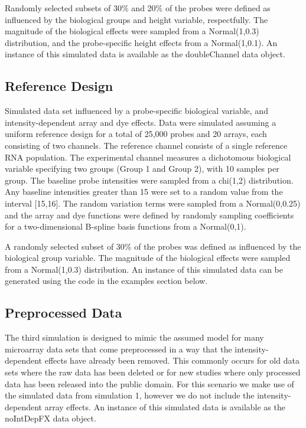 \documentclass[11pt]{article}
\begin{document}
Randomly selected subsets of 30\% and 20\% of the probes were defined as influenced by the biological groups and 
height variable, respectfully.  The magnitude of the biological effects were sampled from a Normal(1,0.3) distribution, 
and the probe-specific height effects from a Normal(1,0.1). An instance of this simulated data is available as the doubleChannel data object. 

\subsection{Reference Design}\label{simDetailsRD}
Simulated data set influenced by a probe-specific biological variable, and intensity-dependent
array and dye effects.  Data were simulated assuming a uniform reference design for a total of 25,000 probes and 20 arrays, each consisting of two channels.  
The reference channel consists of a single reference RNA population. The experimental channel measures a 
dichotomous biological variable specifying two groups (Group 1 and Group 2), with 10 samples per group.  The baseline probe intensities  
were sampled from a chi(1,2) distribution.  Any baseline intensities greater than 15 were set to a random value from the 
interval [15,16].  The random variation terms were sampled from a Normal(0,0.25) and the array and dye functions were defined by randomly sampling coefficients 
for a two-dimensional B-spline basis functions from a Normal(0,1).

A randomly selected subset of 30\% of the probes was defined as influenced by the biological group variable.  The magnitude of the biological 
effects were sampled from a Normal(1,0.3) distribution. An instance of this simulated data can be generated using the code in the examples section below. 

\subsection{Preprocessed Data}\label{simDetailsPP}
The third simulation is designed to mimic the assumed model for many microarray data sets that come preprocessed in a way that the intensity-dependent
effects have already been removed.  This commonly occurs for old data sets where the raw data has been deleted or for new studies where only
processed data has been released into the public domain. For this scenario we make use of the simulated data from simulation 1, however we do 
not include the intensity-dependent array effects.  An instance of this simulated data is available as the noIntDepFX data object. \\

 
\end{document}
